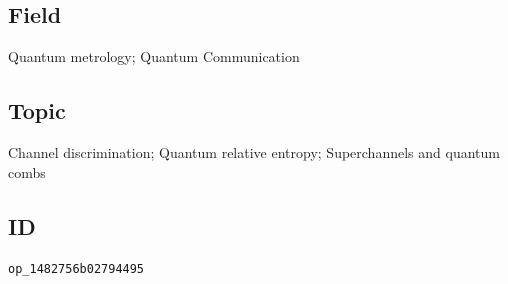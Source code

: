 \subsection*{Field}

Quantum metrology; Quantum Communication

\subsection*{Topic}

Channel discrimination; Quantum relative entropy; Superchannels and quantum combs

\subsection*{ID}

\texttt{op\_1482756b02794495}
